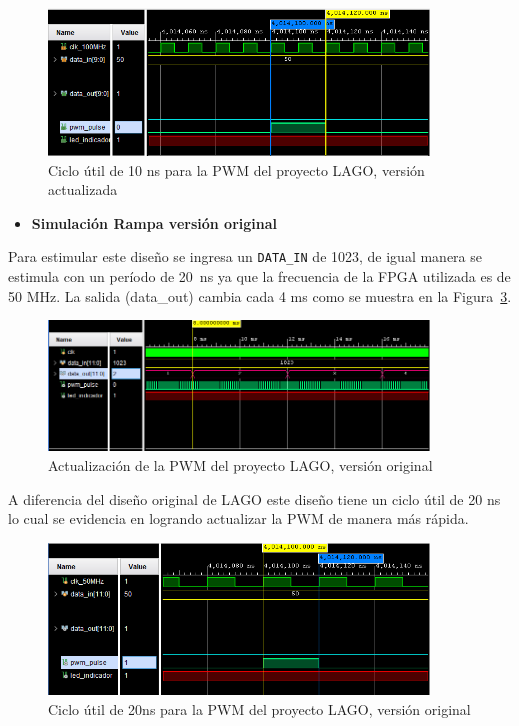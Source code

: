 \begin{figure}[H]
\includegraphics[width=0.9\textwidth]{Figs/zomnuevo.PNG} \centering
\caption{Ciclo útil de 10 ns para la PWM del proyecto LAGO, versión actualizada}
\label{10ns2}
\end{figure}


\begin{itemize}
    \item {\textbf{Simulación Rampa versión original}}
\end{itemize}

Para estimular este diseño se ingresa un \texttt{DATA\_IN} de 1023, de igual manera se estimula con un período de 20~ns ya que la frecuencia de la FPGA utilizada es de 50 MHz.
La salida (data\_out) cambia cada 4 ms como se muestra en la Figura~\ref{ciclo10}.

\begin{figure}[H]
\includegraphics[width=0.9\textwidth]{Figs/pwmoriginal.PNG} 
\centering
\caption{Actualización de la PWM del proyecto LAGO, versión original}
\label{actualizacionac}
\end{figure}

A diferencia del diseño original de LAGO este diseño tiene un ciclo útil de 20 ns lo cual se evidencia en logrando actualizar la PWM de manera más rápida.

\begin{figure}[H]
\includegraphics[width=0.9\textwidth]{Figs/zomviejo.PNG} 
\centering
\caption{Ciclo útil de 20ns para la PWM del proyecto LAGO, versión original}
\label{ciclo10}
\end{figure}

